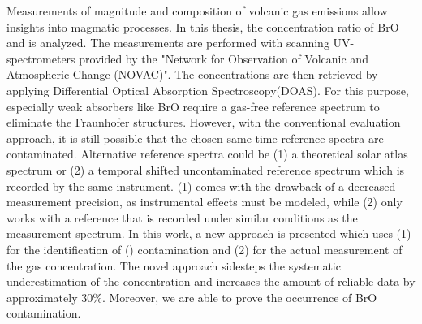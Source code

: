 

Measurements of magnitude and composition of volcanic gas emissions allow insights into magmatic processes. In this thesis, the concentration ratio of BrO and  is analyzed. The measurements are performed with scanning UV-spectrometers provided by the "Network for Observation of Volcanic and Atmospheric Change (NOVAC)".
The concentrations are then retrieved by applying Differential Optical Absorption Spectroscopy(DOAS).
For this purpose, especially weak absorbers like BrO require a gas-free reference spectrum to eliminate the Fraunhofer structures.
However, with the conventional evaluation approach, it is still possible that the chosen same-time-reference spectra are contaminated. Alternative reference spectra could be (1) a theoretical solar atlas spectrum or (2) a temporal shifted uncontaminated reference spectrum which is recorded by the same instrument. (1) comes with the drawback of a decreased measurement precision, as instrumental effects must be modeled, while (2) only works with a reference that is recorded under similar conditions as the measurement spectrum. In this work, a new approach is presented which uses (1) for the identification of () contamination and (2) for the actual measurement of the gas concentration. The novel approach sidesteps the systematic underestimation of the concentration and increases the amount of reliable data by approximately 30\%. Moreover, we are able to prove the occurrence of BrO contamination.